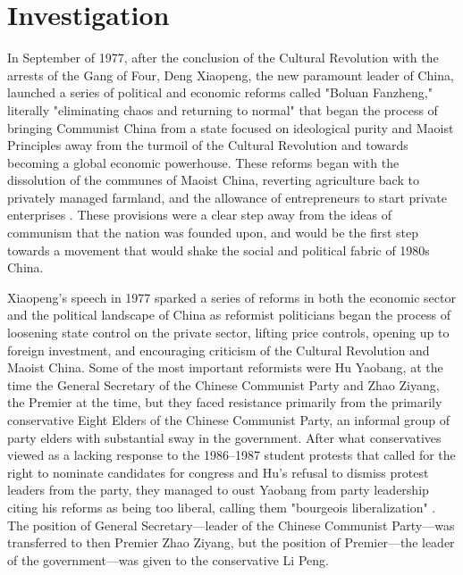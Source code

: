 \documentclass{paper}
\begin{document}
\section{Investigation}
In September of 1977, after the conclusion of the Cultural Revolution with the arrests of the Gang of Four, Deng Xiaopeng, the new paramount leader of China, launched a series of political and economic reforms called "Boluan Fanzheng," literally "eliminating chaos and returning to normal" that began the process of bringing Communist China from a state focused on ideological purity and Maoist Principles away from the turmoil of the Cultural Revolution and towards becoming a global economic powerhouse.
These reforms began with the dissolution of the communes of Maoist China, reverting agriculture back to privately managed farmland, and the allowance of entrepreneurs to start private enterprises \autocite{reforms}.
These provisions were a clear step away from the ideas of communism that the nation was founded upon, and would be the first step towards a movement that would shake the social and political fabric of 1980s China.

Xiaopeng's speech in 1977 sparked a series of reforms in both the economic sector and the political landscape of China as reformist politicians began the process of loosening state control on the private sector, lifting price controls, opening up to foreign investment, and encouraging criticism of the Cultural Revolution and Maoist China.
Some of the most important reformists were Hu Yaobang, at the time the General Secretary of the Chinese Communist Party and Zhao Ziyang, the Premier at the time, but they faced resistance primarily from the primarily conservative Eight Elders of the Chinese Communist Party, an informal group of party elders with substantial sway in the government.
After what conservatives viewed as a lacking response to the 1986--1987 student protests that called for the right to nominate candidates for congress and Hu's refusal to dismiss protest leaders from the party, they managed to oust Yaobang from party leadership citing his reforms as being too liberal, calling them "bourgeois liberalization" \autocite{deng}.
The position of General Secretary---leader of the Chinese Communist Party---was transferred to then Premier Zhao Ziyang, but the position of Premier---the leader of the government---was given to the conservative Li Peng.
\end{document}
